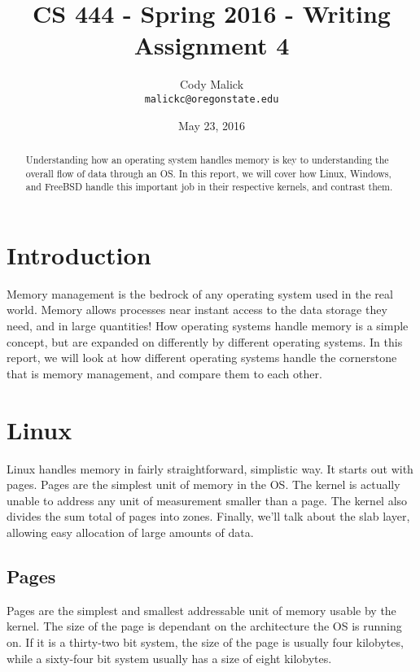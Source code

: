 \documentclass[10pt,letterpaper,onecolumn,draftclsnofoot]{IEEEtran}
\begin{document}
  \begin{titlepage}
    \title{CS 444 - Spring 2016 - Writing Assignment 4}
    \author{Cody Malick\\
    \texttt{malickc@oregonstate.edu}}
    \date{May 23, 2016}
    \maketitle
    \vspace{4cm}
    \begin{abstract}
      \noindent Understanding how an operating system handles memory is key
      to understanding the overall flow of data through an OS. In this report,
      we will cover how Linux, Windows, and FreeBSD handle this important job
      in their respective kernels, and contrast them.
    \end{abstract}
  \end{titlepage}

  \tableofcontents
  \clearpage
  \section{Introduction}
  Memory management is the bedrock of any operating system used in the real
  world. Memory allows processes near instant access to the data storage they
  need, and in large quantities! How operating systems handle memory is a simple
  concept, but are expanded on differently by different operating systems. In 
  this report, we will look at how different operating systems handle the
  cornerstone that is memory management, and compare them to each other. 
  
  \section{Linux}
	Linux handles memory in fairly straightforward, simplistic way. It
	starts out with pages. Pages are the simplest unit of memory in the OS.
	The kernel is actually unable to address any unit of measurement smaller
	than a page. The kernel also divides the sum total of pages into zones.
	Finally, we'll talk about the slab layer, allowing easy allocation of
	large amounts of data.
  \subsection{Pages}
  	Pages are the simplest and smallest addressable unit of memory usable
	by the kernel. The size of the page is dependant on the architecture
	the OS is running on. If it is a thirty-two bit system, the size of the
	page is usually four kilobytes, while a sixty-four bit system usually
	has a size of eight kilobytes. \cite{robertlove2010}
\end{document}
